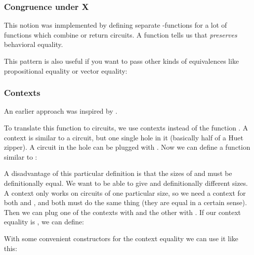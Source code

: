 \subsubsection{Congruence under X}\label{congruence-under-x}

This notion was inmplemented by defining separate
-functions for a lot of functions which combine or return
circuits. A function  tells us that  \emph{preserves}
behavioral equality.


This pattern is also useful if you want to pass other kinds of
equivalences like propositional equality or vector equality:


\subsubsection{Contexts}\label{contexts}

An earlier approach was inspired by .

To translate this function to circuits, we use contexts instead of the
function .
A context is similar to a circuit, but one single hole in it
(basically half of a Huet zipper).
A circuit in the hole can be plugged with .
Now we can define a function similar to :


A disadvantage of this particular definition is that the sizes of
 and  must be definitionally equal.
We want to be able to give  and  definitionally different
sizes.
A context only works on circuits of one particular size, so we need
a context for both  and , and both must do the same thing
(they are equal in a certain sense).
Then we can plug one of the contexts with  and the other with
.
If our context equality is , we can define:


With some convenient constructors for the context equality 
we can use it like this:


